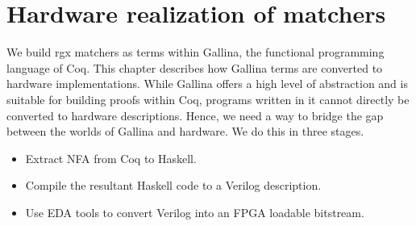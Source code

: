 \chapter{Hardware realization of matchers} \label{ch:hdlgen}
We build \gls{rgx} matchers as terms within Gallina, the functional
programming language of Coq.
This chapter describes how Gallina terms are converted to hardware
implementations.
%
While Gallina offers a high level of abstraction and is suitable for
building proofs within Coq, programs written in it cannot directly be
converted to hardware descriptions.
Hence, we need a way to bridge the gap between the worlds of Gallina
and hardware.
We do this in three stages.
%
\begin{itemize}
  \item Extract \gls{NFA} from Coq to Haskell.
  \item Compile the resultant Haskell code to a Verilog description.
  \item Use \gls{EDA} tools to convert Verilog into an \gls{FPGA}
    loadable bitstream.
\end{itemize}




